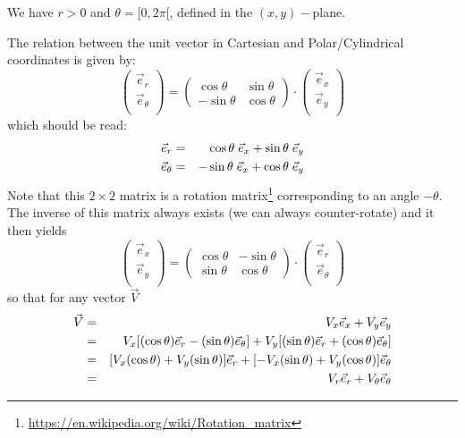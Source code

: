 We have $r>0$ and $\theta=[0,2\pi[$, defined in the $(x,y)-$plane.



\noindent The relation between the unit vector in Cartesian and Polar/Cylindrical coordinates
is given by:
\[
\left(
\begin{array}{c}
{\vec e}_{r} \\
{\vec e}_{\theta} \\
\end{array}
\right)
=
\left(
\begin{array}{cc}
\cos \theta & \sin \theta \\
-\sin \theta & \cos \theta
\end{array}
\right)
\cdot
\left(
\begin{array}{c}
{\vec e}_{x} \\
{\vec e}_{y} \\
\end{array}
\right)
\]
which should be read:
\begin{eqnarray}
{\vec e}_{r}      &=& \cos\theta \; {\vec e}_{x} + \sin\theta \;  {\vec e}_{y} \nonumber\\
{\vec e}_{\theta} &=& -\sin\theta \; {\vec e}_{x} + \cos\theta \;  {\vec e}_{y} 
\end{eqnarray}
Note that this $2\times 2$ matrix is a 
rotation matrix\footnote{\url{https://en.wikipedia.org/wiki/Rotation_matrix}}
corresponding to an angle $-\theta$. The inverse of this matrix always exists 
(we can always counter-rotate) and it then yields
\[
\left(
\begin{array}{c}
{\vec e}_{x} \\
{\vec e}_{y} \\
\end{array}
\right)
=
\left(
\begin{array}{cc}
\cos \theta & -\sin \theta \\
\sin \theta & \cos \theta
\end{array}
\right)
\cdot
\left(
\begin{array}{c}
{\vec e}_{r} \\
{\vec e}_{\theta} \\
\end{array}
\right)
\]
so that for any vector ${\vec V}$
\begin{eqnarray}
{\vec V} 
&=& V_x {\vec e}_x  + V_y {\vec e}_y \nonumber\\
&=& V_x [(\cos \theta) {\vec e}_r - (\sin \theta) {\vec e}_\theta]  + 
    V_y [(\sin \theta) {\vec e}_r + (\cos \theta){\vec e}_\theta] \nonumber\\
&=& [V_x (\cos \theta) + V_y (\sin \theta)] {\vec e}_r +
[- V_x(\sin \theta) + V_y (\cos \theta)]{\vec e}_\theta \nonumber\\
&=& V_r \vec{e}_r  + V_\theta \vec{e}_\theta \nonumber
\end{eqnarray}
